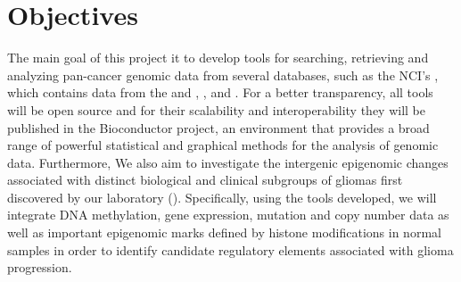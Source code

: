 
\newcommand{\comando}[1]{\textbf{$\backslash$#1}}


\section{Objectives}

The main goal of this project it to develop tools for searching, retrieving and analyzing pan-cancer genomic data from several databases, such as the NCI's  , which contains data from the  and , , and .  For a better transparency, all tools will be open source and for their scalability and interoperability they will be published in the Bioconductor project, an environment that provides a broad range of powerful statistical and graphical methods for the analysis of genomic data.
Furthermore, We also aim to investigate the intergenic epigenomic changes associated with distinct biological and clinical subgroups of gliomas first discovered by our laboratory (\cite{cell}). Specifically, using the tools developed, we will integrate DNA methylation, gene expression, mutation and copy number data as well as important epigenomic marks defined by histone modifications in normal samples in order to identify candidate regulatory elements associated with glioma progression.


